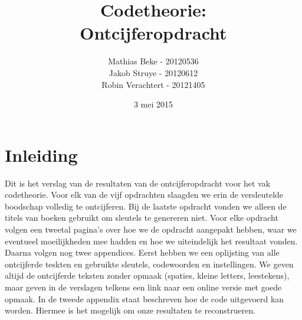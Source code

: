 \documentclass[a4paper,11pt]{article}
\author{Mathias Beke - 20120536\\ Jakob Struye - 20120612 \\ Robin Verachtert - 20121405}
\title{Codetheorie: \\Ontcijferopdracht}
\date{3 mei 2015}
\begin{document}
\maketitle 
\tableofcontents
\pagebreak

\section{Inleiding}
Dit is het verslag van de resultaten van de ontcijferopdracht voor het vak codetheorie. Voor elk van de vijf opdrachten slaagden we erin de versleutelde boodschap volledig te ontcijferen. Bij de laatste opdracht vonden we alleen de titels van boeken gebruikt om sleutels te genereren niet. Voor elke opdracht volgen een tweetal pagina's over hoe we de opdracht aangepakt hebben, waar we eventueel moeilijkheden mee hadden en hoe we uiteindelijk het resultaat vonden. Daarna volgen nog twee appendices. Eerst hebben we een oplijsting van alle ontcijferde teskten en gebruikte sleutels, codewoorden en instellingen. We geven altijd de ontcijferde teksten zonder opmaak (spaties, kleine letters, leestekens), maar geven in de verslagen telkens een link naar een online versie met goede opmaak. In de tweede appendix staat beschreven hoe de code uitgevoerd kan worden. Hiermee is het mogelijk om onze resultaten te reconstrueren.




\pagebreak %


\pagebreak %

\end{document}
